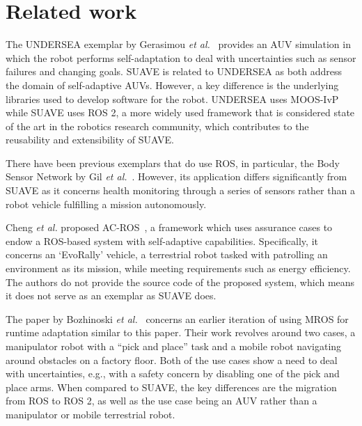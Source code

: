 \section{Related work}\label{sec:related}

The UNDERSEA exemplar by Gerasimou \emph{et
al.}~\cite{undersea} provides an AUV simulation in which the robot performs self-adaptation to
deal with uncertainties such as sensor failures and changing goals.
SUAVE is related to UNDERSEA as both address the domain of self-adaptive AUVs. However, a
key difference is the underlying libraries used to develop software
for the robot. UNDERSEA uses MOOS-IvP while SUAVE uses
ROS 2, a more widely used framework that is considered state of the art in the robotics
research community, which contributes to the reusability and extensibility of
SUAVE\@.

There have been previous exemplars that do use ROS, in particular, the
Body Sensor Network by Gil \emph{et al.}~\cite{bsnexemplarROS}. However,
its application differs significantly from SUAVE as it concerns
health monitoring through a series of sensors rather than a robot
vehicle fulfilling a mission autonomously.

Cheng \emph{et al.} proposed AC-ROS~\cite{ACROS}, a framework
which uses assurance cases to endow a ROS-based system with
self-adaptive capabilities. Specifically, it concerns an `EvoRally'
vehicle, a terrestrial robot tasked with patrolling an environment as
its mission, while meeting requirements such as energy
efficiency. The authors
do not provide the source code of the proposed system,
which means it does not serve as an exemplar as SUAVE
does.

The paper by Bozhinoski \emph{et al.}~\cite{bozhinoski2022mros} concerns an earlier iteration of using MROS for runtime adaptation similar to this paper. Their work revolves around two cases, a manipulator robot with a ``pick and place'' task and a mobile robot navigating around obstacles on a factory floor. Both of the use cases show a need to deal with uncertainties, e.g., with a safety concern by disabling one of the pick and place arms. When compared to SUAVE, the key differences are the migration from ROS to ROS 2, as well as the use case being an AUV rather than a manipulator or mobile terrestrial robot.

